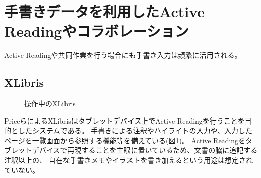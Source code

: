\section{手書きデータを利用したActive Readingやコラボレーション}
Active Readingや共同作業を行う場合にも手書き入力は頻繁に活用される。

\subsection{XLibris}
\begin{figure}[H]
    \centering
    \caption{操作中のXLibris}
    \label{fig:xlibris}
\end{figure}
PriceらによるXLibris\cite{Price1998XLibrisTA}はタブレットデバイス上でActive Readingを行うことを目的としたシステムである。
手書きによる注釈やハイライトの入力や、入力したページを一覧画面から参照する機能等を備えている(図\ref{fig:xlibris})。
Active Readingをタブレットデバイスで再現することを主眼に置いているため、文書の脇に追記する注釈以上の、
自在な手書きメモやイラストを書き加えるという用途は想定されていない。

%
%

